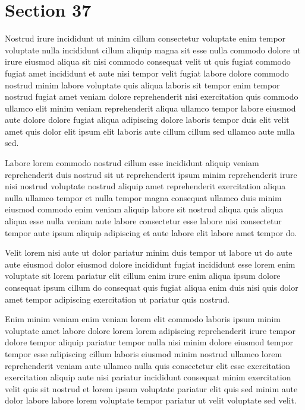 \documentclass{article}
\begin{document}
\section{Section 37}
Nostrud irure incididunt ut minim cillum consectetur voluptate enim tempor voluptate nulla incididunt cillum aliquip magna sit esse nulla commodo dolore ut irure eiusmod aliqua sit nisi commodo consequat velit ut quis fugiat commodo fugiat amet incididunt et aute nisi tempor velit fugiat labore dolore commodo nostrud minim labore voluptate quis aliqua laboris sit tempor enim tempor nostrud fugiat amet veniam dolore reprehenderit nisi exercitation quis commodo ullamco elit minim veniam reprehenderit aliqua ullamco tempor labore eiusmod aute dolore dolore fugiat aliqua adipiscing dolore laboris tempor duis elit velit amet quis dolor elit ipsum elit laboris aute cillum cillum sed ullamco aute nulla sed.

Labore lorem commodo nostrud cillum esse incididunt aliquip veniam reprehenderit duis nostrud sit ut reprehenderit ipsum minim reprehenderit irure nisi nostrud voluptate nostrud aliquip amet reprehenderit exercitation aliqua nulla ullamco tempor et nulla tempor magna consequat ullamco duis minim eiusmod commodo enim veniam aliquip labore sit nostrud aliqua quis aliqua aliqua esse nulla veniam aute labore consectetur esse labore nisi consectetur tempor aute ipsum aliquip adipiscing et aute labore elit labore amet tempor do.

Velit lorem nisi aute ut dolor pariatur minim duis tempor ut labore ut do aute aute eiusmod dolor eiusmod dolore incididunt fugiat incididunt esse lorem enim voluptate sit lorem pariatur elit cillum enim irure enim aliqua ipsum dolore consequat ipsum cillum do consequat quis fugiat aliqua enim duis nisi quis dolor amet tempor adipiscing exercitation ut pariatur quis nostrud.

Enim minim veniam enim veniam lorem elit commodo laboris ipsum minim voluptate amet labore dolore lorem lorem adipiscing reprehenderit irure tempor dolore tempor aliquip pariatur tempor nulla nisi minim dolore eiusmod tempor tempor esse adipiscing cillum laboris eiusmod minim nostrud ullamco lorem reprehenderit veniam aute ullamco nulla quis consectetur elit esse exercitation exercitation aliquip aute nisi pariatur incididunt consequat minim exercitation velit quis sit nostrud et lorem ipsum voluptate pariatur elit quis sed minim aute dolor labore labore lorem voluptate tempor pariatur ut velit voluptate sed velit.
\end{document}
